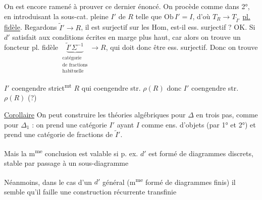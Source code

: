 On est encore ramené à prouver ce dernier énoncé. On procède comme dans 2°, en introduisant la sous-cat. pleine $I'$ de $R$ telle que $\mathrm{Ob}\,I'=I$, d'où $T_R\longrightarrow T_{\widetilde I'}$ \uline{pl. fidèle}. Regardons $\widetilde I'\longrightarrow R$, il est  surjectif sur les Hom,  est-il ess. surjectif ? OK. Si  $d'$  satisfait aux conditions écrites en marge plus haut, car alors on trouve un \inserted{$\Delta$-}foncteur pl. fidèle $\underbrace{\widetilde I'\Sigma^{-1}}_{\substack{\text{catégorie}\\\text{de fractions}\\\text{habituelle}}}\longrightarrow R$,  qui doit donc être ess. surjectif. Donc on trouve


$I'$ coengendre strict\textsuperscript{mt} $R$ qui coengendre str. $\rho(R)$ donc $I'$ coengendre str. $\rho(R)$ (?)

\uline{Corollaire}  On peut construire les théories algébriques pour $\Delta$ en trois pas, comme pour $\Delta_1$ : on prend une catégorie $I'$ ayant $I$ comme ens. d'objets (par 1° et 2°) et prend une catégorie de fractions de $\widetilde I'$.

Mais la m\textsuperscript{me} conclusion est valable si p. ex. $d'$ est formé de diagrammes discrets, stable par passage à un sous-diagramme \unsure{(|\{} 

Néanmoins, dans le cas d'un $d'$ général (m\textsuperscript{me} formé de diagrammes finis) il semble qu'il faille une construction récurrente transfinie

